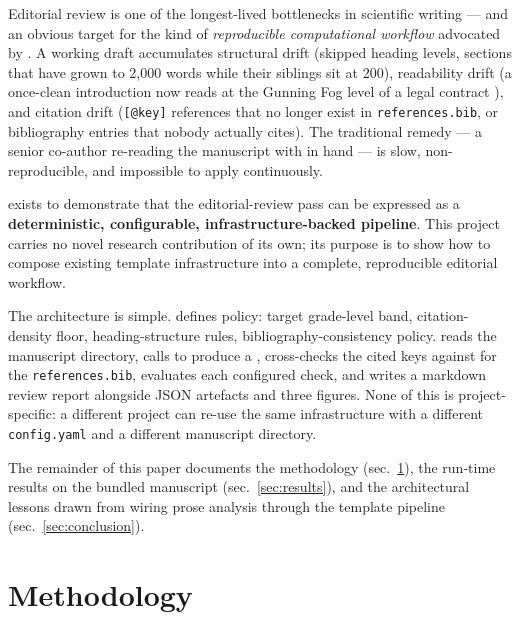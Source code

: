 \documentclass[
]{article}
\begin{document}
Editorial review is one of the longest-lived bottlenecks in scientific
writing --- and an obvious target for the kind of \emph{reproducible
computational workflow} advocated by \citep{peng2011reproducible}. A
working draft accumulates structural drift (skipped heading levels,
sections that have grown to 2,000 words while their siblings sit at
200), readability drift (a once-clean introduction now reads at the
Gunning Fog level of a legal contract \citep{gunning1952technique}), and
citation drift (\texttt{{[}@key{]}} references that no longer exist in
\texttt{references.bib}, or bibliography entries that nobody actually
cites). The traditional remedy --- a senior co-author re-reading the
manuscript with \citep{strunk2000elements} in hand --- is slow,
non-reproducible, and impossible to apply continuously.

 exists to demonstrate that the
editorial-review pass can be expressed as a \textbf{deterministic,
configurable, infrastructure-backed pipeline}. This project carries no
novel research contribution of its own; its purpose is to show how to
compose existing template infrastructure into a complete, reproducible
editorial workflow.

The architecture is simple.  defines
policy: target grade-level band, citation-density floor,
heading-structure rules, bibliography-consistency policy.
 reads the
manuscript directory, calls
\href{../../../../infrastructure/prose/SKILL.md}{}
to produce a , cross-checks the cited keys
against
\href{../../../../infrastructure/reference/citation/SKILL.md}{}
for the \texttt{references.bib}, evaluates each configured check, and
writes a markdown review report alongside JSON artefacts and three
figures. None of this is project-specific: a different project can
re-use the same infrastructure with a different \texttt{config.yaml} and
a different manuscript directory.

The remainder of this paper documents the methodology
(sec.~\ref{sec:methodology}), the run-time results on the bundled
manuscript (sec.~\ref{sec:results}), and the architectural lessons drawn
from wiring prose analysis through the template pipeline
(sec.~\ref{sec:conclusion}).

\newpage

\section{Methodology}\label{sec:methodology}
\end{document}
